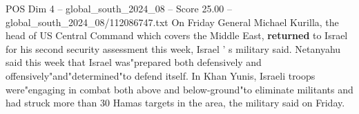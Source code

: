 \begin{textsample}{POS Dim 4 – global\_south\_2024\_08 – Score 25.00 – global\_south\_2024\_08/112086747.txt}
On Friday General Michael Kurilla, the head of US Central Command which covers the Middle East, \textbf{returned} to Israel for his second security assessment this week, Israel ' s military said.
Netanyahu said this week that Israel was"prepared both defensively and offensively"and"determined"to defend itself.
In Khan Yunis, Israeli troops were"engaging in combat both above and below-ground"to eliminate militants and had struck more than 30 Hamas targets in the area, the military said on Friday.

\end{textsample}
